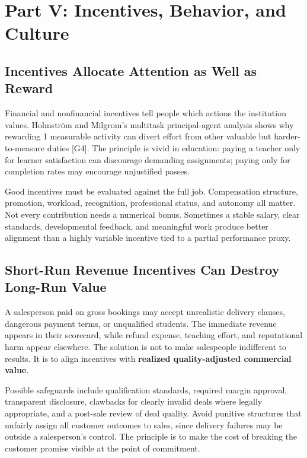 \section*{Part V: Incentives, Behavior, and Culture}

\subsection{Incentives Allocate Attention as Well as Reward}
\label{sec:incentives_allocate_attention}

Financial and nonfinancial incentives tell people which actions the institution values. Holmstr\"{o}m and Milgrom's multitask principal-agent analysis shows why rewarding 1 measurable activity can divert effort from other valuable but harder-to-measure duties [G4]. The principle is vivid in education: paying a teacher only for learner satisfaction can discourage demanding assignments; paying only for completion rates may encourage unjustified passes.

Good incentives must be evaluated against the full job. Compensation structure, promotion, workload, recognition, professional status, and autonomy all matter. Not every contribution needs a numerical bonus. Sometimes a stable salary, clear standards, developmental feedback, and meaningful work produce better alignment than a highly variable incentive tied to a partial performance proxy.

\subsection{Short-Run Revenue Incentives Can Destroy Long-Run Value}
\label{sec:short_run_revenue_incentives}

A salesperson paid on gross bookings may accept unrealistic delivery clauses, dangerous payment terms, or unqualified students. The immediate revenue appears in their scorecard, while refund expense, teaching effort, and reputational harm appear elsewhere. The solution is not to make salespeople indifferent to results. It is to align incentives with \textbf{realized quality-adjusted commercial value}.

Possible safeguards include qualification standards, required margin approval, transparent disclosure, clawbacks for clearly invalid deals where legally appropriate, and a post-sale review of deal quality. Avoid punitive structures that unfairly assign all customer outcomes to sales, since delivery failures may be outside a salesperson's control. The principle is to make the cost of breaking the customer promise visible at the point of commitment.

